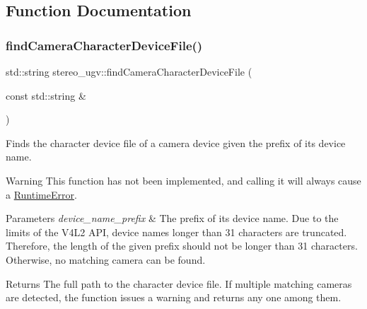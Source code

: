 \subsection{Function Documentation}
\mbox{\label{namespacestereo__ugv_af45c67058883fb26e2c27945af6ab490}} 
\subsubsection{\texorpdfstring{find\+Camera\+Character\+Device\+File()}{findCameraCharacterDeviceFile()}}
{\footnotesize\ttfamily std\+::string stereo\+\_\+ugv\+::find\+Camera\+Character\+Device\+File (\begin{DoxyParamCaption}\item[{const std\+::string \&}]{ }\end{DoxyParamCaption})}



Finds the character device file of a camera device given the prefix of its device name. 

\begin{DoxyWarning}{Warning}
This function has not been implemented, and calling it will always cause a \hyperlink{classstereo__ugv_1_1RuntimeError}{Runtime\+Error}. 
\end{DoxyWarning}

\begin{DoxyParams}{Parameters}
{\em device\+\_\+name\+\_\+prefix} & The prefix of its device name. Due to the limits of the V4\+L2 A\+PI, device names longer than 31 characters are truncated. Therefore, the length of the given prefix should not be longer than 31 characters. Otherwise, no matching camera can be found. \\
\hline
\end{DoxyParams}
\begin{DoxyReturn}{Returns}
The full path to the character device file. If multiple matching cameras are detected, the function issues a warning and returns any one among them. 
\end{DoxyReturn}
\mbox{\label{namespacestereo__ugv_ac02cc03581ba53b911a9a7bd87f9a24c}} 
